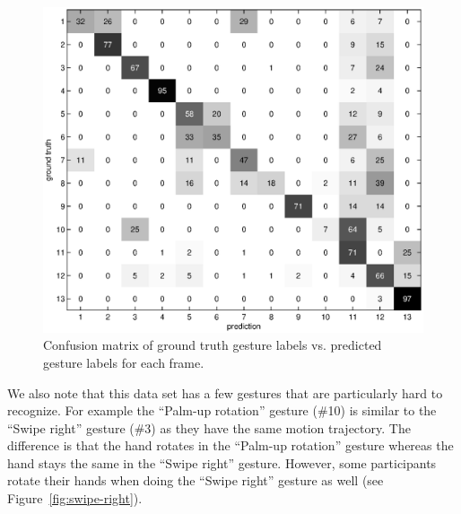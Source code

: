\documentclass{acm_proc_article-sp}
\begin{document}
\begin{figure}
\includegraphics[width=1.1\columnwidth]{fig/confusion-matrix.eps}
\caption{Confusion matrix of ground truth gesture labels vs.
   predicted gesture labels for each frame. }
\label{fig:confusion-matrix}
\end{figure}

We also note that this data set has a few gestures that are particularly hard to recognize.
For example the ``Palm-up rotation'' gesture (\#10) is similar to the ``Swipe right'' gesture (\#3) as they 
have the same motion trajectory. The difference is that the hand rotates in the ``Palm-up rotation'' gesture whereas the 
hand stays the same in the ``Swipe right'' gesture. However, some participants rotate their hands when doing
the ``Swipe right'' gesture as well (see Figure~\ref{fig:swipe-right}).
\end{document}
